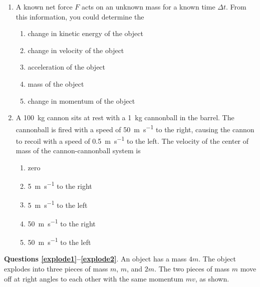 \documentclass{../../../oss-apphys}
\begin{document}
\begin{multicols}{2}
\begin{enumerate}[leftmargin=18pt,resume]
  \item A known net force $F$ acts on an unknown mass for a known time
    $\Delta t$. From this information, you could determine the
    \begin{enumerate}[nosep,leftmargin=18pt,label=(\Alph*)]
    \item change in kinetic energy of the object
    \item change in velocity of the object
    \item acceleration of the object
    \item mass of the object
    \item change in momentum of the object
    \end{enumerate}
    \vspace{.8in}
    
  \item A \SI{100}{\kilo\gram} cannon sits at rest with a \SI{1}{\kilo\gram}
    cannonball in the barrel. The cannonball is fired with a speed of
    \SI{50}{\metre\per\second} to the right, causing the cannon to recoil with
    a speed of \SI{.5}{\metre\per\second} to the left. The velocity of the
    center of mass of the cannon-cannonball system is
    \begin{enumerate}[nosep,leftmargin=18pt,label=(\Alph*)]
    \item zero
    \item\SI{5}{\metre\per\second} to the right
    \item\SI{5}{\metre\per\second} to the left
    \item\SI{50}{\metre\per\second} to the right
    \item\SI{50}{\metre\per\second} to the left
    \end{enumerate}
  \end{enumerate}
  \columnbreak

  \textbf{Questions \ref{explode1}--\ref{explode2}}. An object has a mass $4m$.
  The object explodes into three pieces of mass $m$, $m$, and $2m$. The two
  pieces of mass $m$ move off at right angles to each other with the same
  momentum $mv$, as shown.
  \begin{center}
  \end{center}
  

\end{multicols}
\end{document}
